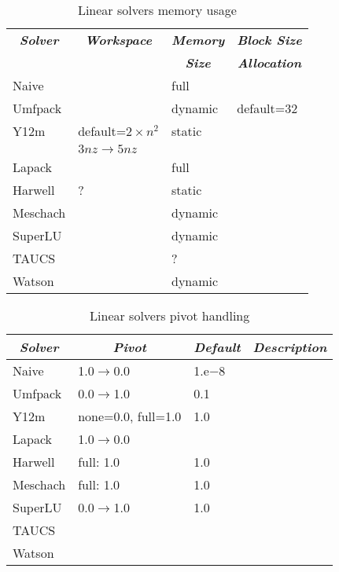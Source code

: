 \begin{table}
\centering
\caption{Linear solvers memory usage}\label{tab:linear-solvers-memory}
\begin{tabular}{llll}
\hline\hline
	\multicolumn{1}{c}{\textbf{\emph{Solver}}} &
	\multicolumn{1}{c}{\textbf{\emph{Workspace}}} &
	\multicolumn{1}{c}{\textbf{\emph{Memory}}} &
	\multicolumn{1}{c}{\textbf{\emph{Block Size}}} \\
	&
	&
	\multicolumn{1}{c}{\textbf{\emph{Size}}} &
	\multicolumn{1}{c}{\textbf{\emph{Allocation}}} \\
\hline
	Naive		& 			& full		&		\\
	Umfpack 	& 			& dynamic	& default=32	\\
	Y12m 		& default=$2\times{n^2}$& static	&		\\
			& $3nz \rightarrow 5nz$	&		&		\\
	Lapack		&			& full		&		\\
	Harwell		& ?			& static	&		\\
	Meschach	& 			& dynamic	&		\\
	SuperLU		& 			& dynamic 	&		\\
	TAUCS		&			& ?		&		\\
	Watson		&			& dynamic	&		\\
\hline\hline
\end{tabular}
\end{table}

\begin{table}
\centering
\caption{Linear solvers pivot handling}\label{tab:linear-solvers-pivot}
\begin{tabular}{llll}
\hline\hline
	\multicolumn{1}{c}{\textbf{\emph{Solver}}} &
	\multicolumn{1}{c}{\textbf{\emph{Pivot}}} &
	\multicolumn{1}{c}{\textbf{\emph{Default}}} &
	\multicolumn{1}{c}{\textbf{\emph{Description}}} \\
\hline
	Naive		& 1.0$\rightarrow$0.0	& 1.e$-8$	& \\
	Umfpack 	& 0.0$\rightarrow$1.0 	& 0.1 		& \\
	Y12m 		& none=0.0, full=1.0	& 1.0		& \\
	Lapack		& 1.0$\rightarrow$0.0	&		& \\
	Harwell		& full: 1.0		& 1.0		& \\
	Meschach	& full: 1.0		& 1.0		& \\
	SuperLU		& 0.0$\rightarrow$1.0	& 1.0		& \\
	TAUCS		&			&		& \\
	Watson		&			&		& \\
\hline\hline
\end{tabular}
\end{table}




